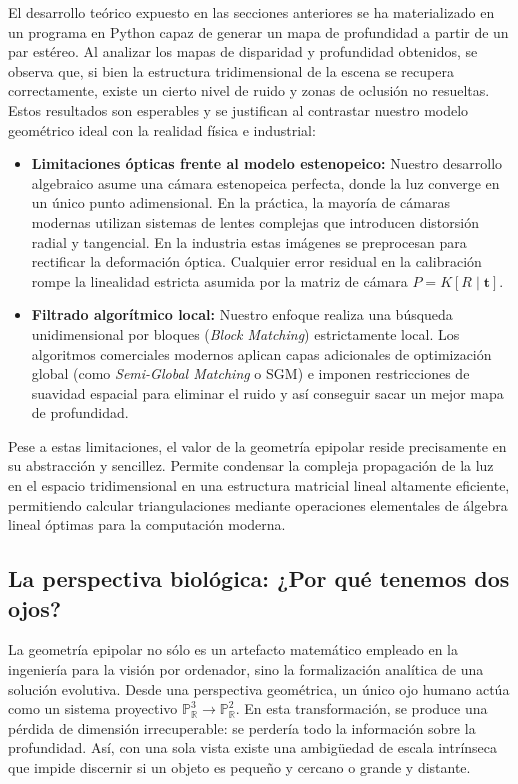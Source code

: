 \documentclass[
10pt, %
a4paper, %
oneside, %
headinclude,footinclude, %
BCOR=5mm, %
]{scrartcl}
\begin{document}
El desarrollo teórico expuesto en las secciones anteriores se ha materializado en un programa en Python capaz de generar un mapa de profundidad a partir de un par estéreo. 
Al analizar los mapas de disparidad y profundidad obtenidos, se observa que, si bien la estructura tridimensional de la escena se recupera correctamente, existe un cierto nivel de ruido y zonas de oclusión no resueltas. Estos resultados son esperables y se justifican al contrastar nuestro modelo geométrico ideal con la realidad física e industrial:

\begin{itemize}
    \item \textbf{Limitaciones ópticas frente al modelo estenopeico:} Nuestro desarrollo algebraico asume una cámara estenopeica perfecta, donde la luz converge en un único punto adimensional. En la práctica, la mayoría de cámaras modernas utilizan sistemas de lentes complejas que introducen distorsión radial y tangencial. En la industria estas imágenes se preprocesan para rectificar la deformación óptica. Cualquier error residual en la calibración rompe la linealidad estricta asumida por la matriz de cámara $P = K[R \mid \mathbf{t}]$.
    \item \textbf{Filtrado algorítmico local:} Nuestro enfoque realiza una búsqueda unidimensional por bloques (\textit{Block Matching}) estrictamente local. Los algoritmos comerciales modernos aplican capas adicionales de optimización global (como \textit{Semi-Global Matching} o SGM) e imponen restricciones de suavidad espacial para eliminar el ruido y así conseguir sacar un mejor mapa de profundidad.
\end{itemize}

Pese a estas limitaciones, el valor de la geometría epipolar reside precisamente en su abstracción y sencillez. Permite condensar la compleja propagación de la luz en el espacio tridimensional en una estructura matricial lineal altamente eficiente, permitiendo calcular triangulaciones mediante operaciones elementales de álgebra lineal óptimas para la computación moderna.

\subsection{La perspectiva biológica: ¿Por qué tenemos dos ojos?}

La geometría epipolar no sólo es un artefacto matemático empleado en la ingeniería para la visión por ordenador, sino la formalización analítica de una solución evolutiva. Desde una perspectiva geométrica, un único ojo humano actúa como un sistema proyectivo $\mathbb{P}^3_\mathbb{R} \rightarrow \mathbb{P}^2_\mathbb{R}$. En esta transformación, se produce una pérdida de dimensión irrecuperable: se perdería todo la información sobre la profundidad. Así, con una sola vista existe una ambigüedad de escala intrínseca que impide discernir si un objeto es pequeño y cercano o grande y distante.
\end{document}
